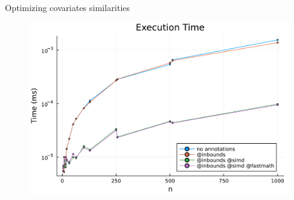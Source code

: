 \documentclass[
	11pt, %
 xcolor={dvipsnames,svgnames}
]{beamer}
\newcommand{\mjline}[1]{\texttt{#1}}
\begin{document}


\begin{frame}{Optimizing covariates similarities}

    \begin{figure}[!ht]
    \centering
    \includegraphics[width=0.9\linewidth]{Plots/execution_time_tests_sims_pow2.pdf}
    \label{fig: exec time sim}
\end{figure}

\end{frame}
\end{document}
